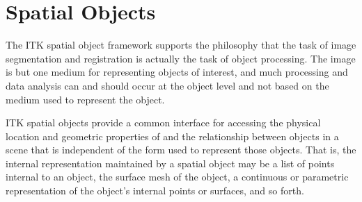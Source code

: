 %
%
%
%
\section{Spatial Objects}
\label{sec:SpatialObjectsOverview}
%
The ITK spatial object framework supports the philosophy that the task of
image segmentation and registration is actually the task of object
processing. The image is but one medium for representing objects of interest,
and much processing and data analysis can and should occur at the object
level and not based on the medium used to represent the object.

ITK spatial objects provide a common interface for accessing the physical
location and geometric properties of and the relationship between objects in
a scene that is independent of the form used to represent those objects. That
is, the internal representation maintained by a spatial object may be a list
of points internal to an object, the surface mesh of the object, a continuous
or parametric representation of the object's internal points or surfaces, and
so forth.

